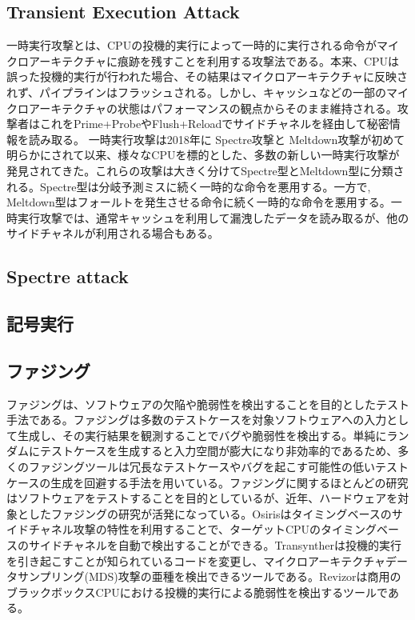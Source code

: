 \documentclass[submit]{ipsj}
\begin{document}
\subsection{Transient Execution Attack}
一時実行攻撃とは、CPUの投機的実行によって一時的に実行される命令がマイクロアーキテクチャに痕跡を残すことを利用する攻撃法である。本来、CPUは誤った投機的実行が行われた場合、その結果はマイクロアーキテクチャに反映されず、パイプラインはフラッシュされる。しかし、キャッシュなどの一部のマイクロアーキテクチャの状態はパフォーマンスの観点からそのまま維持される。攻撃者はこれをPrime+Probe\cite{percival2005cache}やFlush+Reload\cite{yarom2014flush+}でサイドチャネルを経由して秘密情報を読み取る。
一時実行攻撃は2018年に Spectre攻撃\cite{kocher2020spectre}と Meltdown攻撃\cite{lipp2020meltdown}が初めて明らかにされて以来、様々なCPUを標的とした、多数の新しい一時実行攻撃が発見されてきた。これらの攻撃は大きく分けてSpectre型とMeltdown型に分類される\cite{canella2019systematic}。Spectre型は分岐予測ミスに続く一時的な命令を悪用する。一方で, Meltdown型はフォールトを発生させる命令に続く一時的な命令を悪用する。一時実行攻撃では、通常キャッシュを利用して漏洩したデータを読み取るが、他のサイドチャネルが利用される場合もある\cite{bhattacharyya2019smotherspectre,schwarz2019store}。


\subsection{Spectre attack}

\subsection{記号実行}

\subsection{ファジング}
ファジングは、ソフトウェアの欠陥や脆弱性を検出することを目的としたテスト手法である。ファジングは多数のテストケースを対象ソフトウェアへの入力として生成し、その実行結果を観測することでバグや脆弱性を検出する。単純にランダムにテストケースを生成すると入力空間が膨大になり非効率的であるため、多くのファジングツールは冗長なテストケースやバグを起こす可能性の低いテストケースの生成を回避する手法を用いている。ファジングに関するほとんどの研究はソフトウェアをテストすることを目的としているが、近年、ハードウェアを対象としたファジングの研究が活発になっている\cite{weber2021osiris, moghimi2020medusa, oleksenko2023hide}。Osiris\cite{weber2021osiris}はタイミングベースのサイドチャネル攻撃の特性を利用することで、ターゲットCPUのタイミングベースのサイドチャネルを自動で検出することができる。Transynther\cite{moghimi2020medusa}は投機的実行を引き起こすことが知られているコードを変更し、マイクロアーキテクチャデータサンプリング(MDS)攻撃の亜種を検出できるツールである。Revizor\cite{oleksenko2023hide}は商用のブラックボックスCPUにおける投機的実行による脆弱性を検出するツールである。
\end{document}
